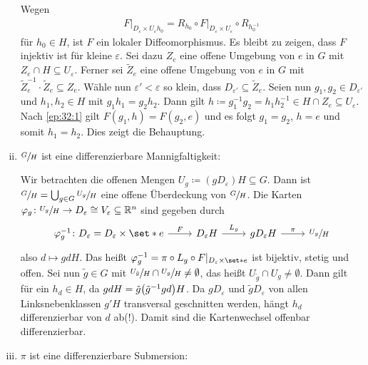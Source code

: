 \begin{beweis}
\begin{enumerate}[(i)]
		Wegen
		\begin{align}
			F\big|_{D_\varepsilon \times U_\varepsilon h_0} = R_{h_0} \circ F\big|_{D_\varepsilon \times U_\varepsilon} \circ R_{h_0^{-1}}
		\end{align}
		für $h_0 \in H$, ist $F$ ein lokaler Diffeomorphismus.
		Es bleibt zu zeigen, dass $F$ injektiv ist für kleine $\varepsilon$.
		Sei dazu $Z_e$ eine offene Umgebung von $e$ in $G$ mit $Z_e \cap H \subseteq U_\varepsilon$.
		Ferner sei $\tilde{Z}_e$ eine offene Umgebung von $e$ in $G$ mit $\tilde{Z}_e^{-1} \cdot \tilde{Z}_e \subseteq Z_e$.
		Wähle nun $\varepsilon' < \varepsilon$ so klein, dass $D_{\varepsilon'} \subseteq \tilde{Z}_e$.
		Seien nun $g_1, g_2 \in D_{\varepsilon'}$ und $h_1,h_2 \in H$ mit $g_1 h_1 = g_2 h_2$.
		Dann gilt $h \coloneqq g_1^{-1} g_2 = h_1 h_2^{-1} \in H \cap Z_e \subseteq U_\varepsilon$.
		Nach \eqref{ep:32:1} gilt $F(g_1,h) = F(g_2,e)$ und es folgt $g_1 =g_2$, $h=e$ und somit $h_1 =h_2$.
		Dies zeigt die Behauptung.
		\item $\sfrac{G}{H}$ ist eine differenzierbare Mannigfaltigkeit:
		
		Wir betrachten die offenen Mengen $U_g \coloneqq (g D_\varepsilon)H \subseteq G$.
		Dann ist $\sfrac{G}{H} = \bigcup_{g \in G} \sfrac{U_g}{H}$ eine offene Überdeckung von $\sfrac{G}{H}$.
		Die Karten $\varphi_g \colon \sfrac{U_g}{H} \to D_\varepsilon \cong V_\varepsilon \subseteq \mathbb{R}^n$ sind gegeben durch 
		\[
			\begin{tikzcd}
				\varphi_g^{-1} \colon D_\varepsilon = D_\varepsilon \times \set*{e}  \rar["F"] & D_\varepsilon H \rar["L_g"] & g D_\varepsilon H \rar["\pi"] & \sfrac{U_g}{H}
			\end{tikzcd}
		\]
		also $d \mapsto gdH$.
		Das heißt $\varphi_g^{-1} = \pi \circ L_g \circ F|_{D_\varepsilon \times \set*{e}}$ ist bijektiv, stetig und offen.
		Sei nun $\tilde{g} \in G$ mit
		\(
			\sfrac{U_{\tilde{g}}}{H} \cap \sfrac{U_g}{H} \neq \emptyset
		\),
		das heißt $U_{\tilde{g}} \cap U_{g} \neq \emptyset$.
		Dann gilt
		für ein $h_d \in H$, da $g d H = \tilde{g} \enbrace*{\tilde{g}^{-1} g d}H$.
		Da $g D_\varepsilon $ und $\tilde{g}D_\varepsilon$ von allen Linksnebenklassen $g' H$ transversal geschnitten werden, hängt $h_d$ differenzierbar von $d$ ab(!).
		Damit sind die Kartenwechsel offenbar differenzierbar.
		\item $\pi$ ist eine differenzierbare Submersion:
		

\end{enumerate}
\end{beweis}

